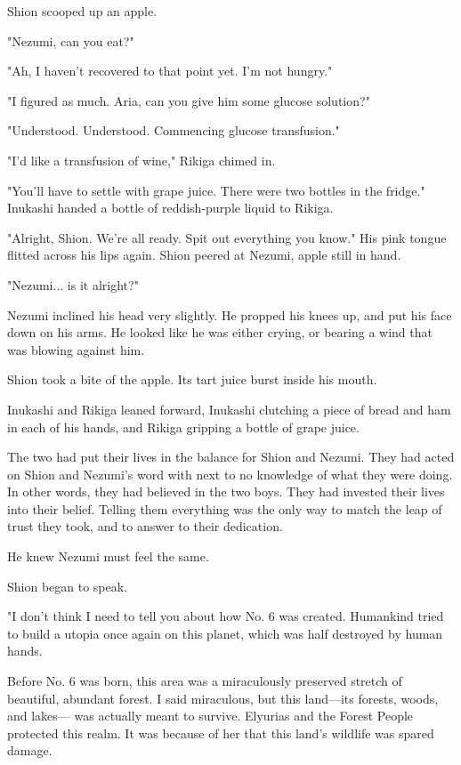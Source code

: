Shion scooped up an apple.

"Nezumi, can you eat?"

"Ah, I haven't recovered to that point yet. I'm not hungry."

"I figured as much. Aria, can you give him some glucose solution?"

{\sffamily "Understood. Understood. Commencing glucose transfusion."}

"I'd like a transfusion of wine," Rikiga chimed in.

"You'll have to settle with grape juice. There were two bottles in the
fridge." Inukashi handed a bottle of reddish-purple liquid to Rikiga.

"Alright, Shion. We're all ready. Spit out everything you know." His
pink tongue flitted across his lips again. Shion peered at Nezumi, apple
still in hand.

"Nezumi... is it alright?"

Nezumi inclined his head very slightly. He propped his knees up, and put
his face down on his arms. He looked like he was either crying, or
bearing a wind that was blowing against him.

Shion took a bite of the apple. Its tart juice burst inside his mouth.

Inukashi and Rikiga leaned forward, Inukashi clutching a piece of bread
and ham in each of his hands, and Rikiga gripping a bottle of grape
juice.

The two had put their lives in the balance for Shion and Nezumi. They
had acted on Shion and Nezumi's word with next to no knowledge of what
they were doing. In other words, they had believed in the two boys. They
had invested their lives into their belief. Telling them everything was
the only way to match the leap of trust they took, and to answer to
their dedication.

He knew Nezumi must feel the same.

Shion began to speak.

\myspace

"I don't think I need to tell you about how No. 6 was created. Humankind
tried to build a utopia once again on this planet, which was half
destroyed by human hands.

Before No. 6 was born, this area was a miraculously preserved stretch of
beautiful, abundant forest. I said miraculous, but this land---its
forests, woods, and lakes--- was actually meant to survive. Elyurias and
the Forest People protected this realm. It was because of her that this
land's wildlife was spared damage.

